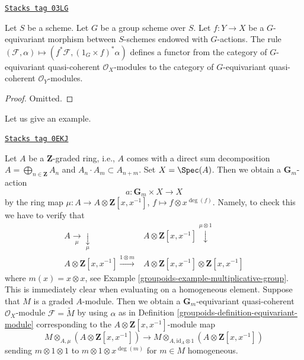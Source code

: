 \begin{lemma}
\label{groupoids-lemma-pullback-equivariant}
\href{https://stacks.math.columbia.edu/tag/03LG}{\texttt{Stacks tag 03LG}}

Let $S$ be a scheme. Let $G$ be a group scheme over $S$.
Let $f : Y \to X$ be a $G$-equivariant morphism between $S$-schemes
endowed with $G$-actions. The rule
$(\mathcal{F}, \alpha) \mapsto (f^*\mathcal{F}, (1_G \times f)^*\alpha)$
defines a functor from the category of $G$-equivariant quasi-coherent
$\mathcal{O}_X$-modules  to the category of
$G$-equivariant quasi-coherent $\mathcal{O}_Y$-modules.
\end{lemma}

\begin{proof}
Omitted.
\end{proof}

Let us give an example.

\begin{example}[Gm on affine]
\label{groupoids-example-Gm-on-affine}
\href{https://stacks.math.columbia.edu/tag/0EKJ}{\texttt{Stacks tag 0EKJ}}

Let $A$ be a $\mathbf{Z}$-graded ring, i.e., $A$ comes with a direct
sum decomposition $A = \bigoplus_{n \in \mathbf{Z}} A_n$ and
$A_n \cdot A_m \subset A_{n + m}$.
Set $X = \Spec(A)$. Then we obtain a $\mathbf{G}_m$-action
$$
a : \mathbf{G}_m \times X \longrightarrow X
$$
by the ring map $\mu : A \to A \otimes \mathbf{Z}[x, x^{-1}]$,
$f \mapsto f \otimes x^{\deg(f)}$.
Namely, to check this we have to verify that
$$
\begin{array}{cc}A \underset{\mu}{\longrightarrow}\underset{\mu}{\downarrow} & A \otimes \mathbf{Z}[x, x^{-1}] \overset{\mu \otimes 1}{\downarrow} \\ A \otimes \mathbf{Z}[x, x^{-1}] \overset{1 \otimes m}{\longrightarrow} & A \otimes \mathbf{Z}[x, x^{-1}] \otimes \mathbf{Z}[x, x^{-1}]\end{array}
$$
where $m(x) = x \otimes x$, see Example \ref{groupoids-example-multiplicative-group}.
This is immediately clear when evaluating on a homogeneous element.
Suppose that $M$ is a graded $A$-module. Then we obtain a
$\mathbf{G}_m$-equivariant quasi-coherent $\mathcal{O}_X$-module
$\mathcal{F} = \widetilde{M}$ by using $\alpha$ as in
Definition \ref{groupoids-definition-equivariant-module} corresponding to the
$A \otimes \mathbf{Z}[x, x^{-1}]$-module map
$$
M \otimes_{A, \mu} (A \otimes \mathbf{Z}[x, x^{-1}])
\longrightarrow
M \otimes_{A, \text{id}_A \otimes 1} (A \otimes \mathbf{Z}[x, x^{-1}])
$$
sending $m \otimes 1 \otimes 1$ to $m \otimes 1 \otimes x^{\deg(m)}$
for $m \in M$ homogeneous.
\end{example}

